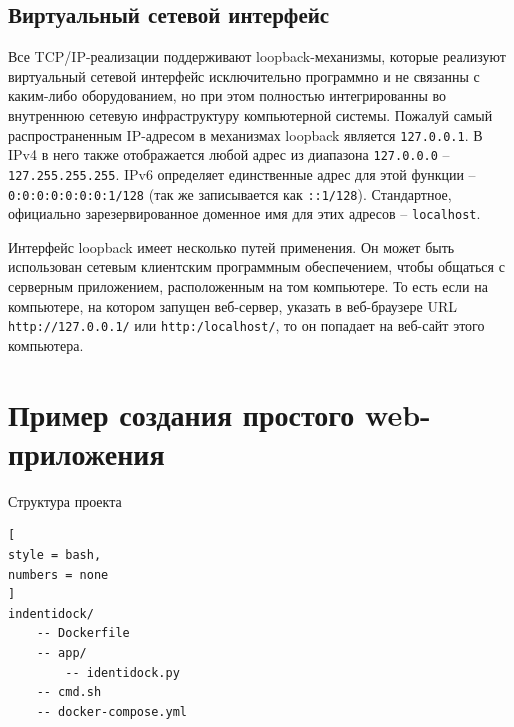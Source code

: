 \documentclass[%
	11pt,
	a4paper,
	utf8,
		]{article}
\begin{document}
\subsection{Виртуальный сетевой интерфейс}

Все TCP/IP-реализации поддерживают loopback-механизмы, которые реализуют виртуальный сетевой интерфейс исключительно программно и не связанны с каким-либо оборудованием, но при этом полностью интегрированны во внутреннюю сетевую инфраструктуру компьютерной системы. Пожалуй самый распространенным IP-адресом в механизмах loopback является \texttt{127.0.0.1}. В IPv4 в него также отображается любой адрес из диапазона \texttt{127.0.0.0} -- \texttt{127.255.255.255}. IPv6 определяет единственные адрес для этой функции -- \texttt{0:0:0:0:0:0:0:1/128} (так же записывается как \texttt{::1/128}). Стандартное, официально зарезервированное доменное имя для этих адресов -- \texttt{localhost}.

Интерфейс loopback имеет несколько путей применения. Он может быть использован сетевым клиентским программным обеспечением, чтобы общаться с серверным приложением, расположенным на том компьютере. То есть если на компьютере, на котором запущен веб-сервер, указать в веб-браузере URL \texttt{http://127.0.0.1/} или \texttt{http:/localhost/}, то он попадает на веб-сайт этого компьютера.



\section{Пример создания простого web-приложения}

Структура проекта \cite[]{mouat:docker-2017}
\begin{lstlisting}[
style = bash,
numbers = none
]
indentidock/
    -- Dockerfile
    -- app/
        -- identidock.py
    -- cmd.sh
    -- docker-compose.yml
\end{lstlisting}
\end{document}
